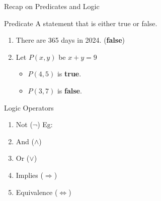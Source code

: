 \documentclass[aspectratio=169]{beamer}
\begin{document}
\begin{frame}{Recap on Predicates and Logic}
    \begin{block}{Predicate}
        A statement that is either true or false.
        \begin{enumerate}
            \item There are 365 days in 2024. (\textbf{false})
            \item Let $P(x, y)$ be $x + y = 9$
            \begin{itemize}
                \item $P(4, 5)$ is \textbf{true}.
                \item $P(3, 7)$ is \textbf{false}.
            \end{itemize}
        \end{enumerate}
    \end{block}
    \begin{block}{Logic Operators}
        \begin{enumerate}
            \item Not ($\neg$) Eg: 
            \item And ($\wedge$)
            \item Or ($\vee$)
            \item Implies ($\Rightarrow$)
            \item Equivalence ($\Leftrightarrow$)
        \end{enumerate}
    \end{block}
\end{frame}
\end{document}
